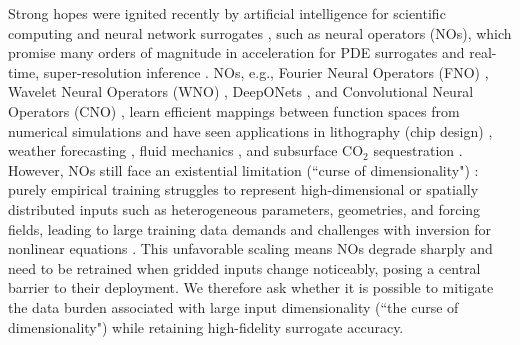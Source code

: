 Strong hopes were ignited recently by artificial intelligence for scientific computing and neural network surrogates \citep{zong2026mathematics}, such as neural operators (NOs), which promise many orders of magnitude in acceleration for PDE surrogates and real-time, super-resolution inference \citep{li2021fourier, lu2021learning, kovachki2023neural, wang2024deep, qin2024toward}. NOs, e.g., Fourier Neural Operators (FNO) \citep{li2021fourier}, Wavelet Neural Operators (WNO) \citep{tripura2023wavelet}, DeepONets \citep{lu2021learning}, and Convolutional Neural Operators (CNO) \citep{raonic2023convolutional}, learn efficient mappings between function spaces from numerical simulations and have seen applications in lithography (chip design) \citep{yang2022large}, weather forecasting \citep{kurth2023fourcastnet}, fluid mechanics \citep{han2022equivariant}, and subsurface CO$_2$ sequestration \citep{wen2023real}. However, NOs still face an existential limitation (``curse of dimensionality") \citep{lanthaler2025parametric, kovachki2024data}: purely empirical training struggles to represent high-dimensional or spatially distributed inputs such as heterogeneous parameters, geometries, and forcing fields, leading to large training data demands and challenges with inversion for nonlinear equations \citep{kovachki2023neural}. This unfavorable scaling means NOs degrade sharply and need to be retrained when gridded inputs change noticeably, posing a central barrier to their deployment. We therefore ask whether it is possible to mitigate the data burden associated with large input dimensionality (``the curse of dimensionality") while retaining high-fidelity surrogate accuracy.

